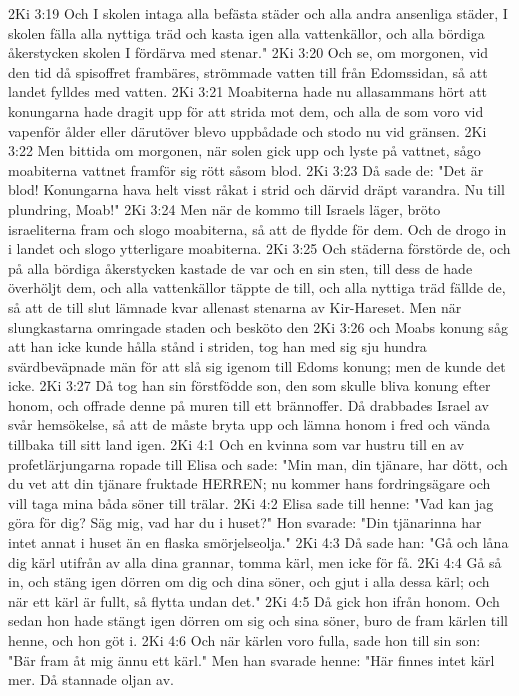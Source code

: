 2Ki 3:19  Och I skolen intaga alla befästa städer och alla andra ansenliga städer, I skolen fälla alla nyttiga träd och kasta igen alla vattenkällor, och alla bördiga åkerstycken skolen I fördärva med stenar."
2Ki 3:20  Och se, om morgonen, vid den tid då spisoffret frambäres, strömmade vatten till från Edomssidan, så att landet fylldes med vatten.
2Ki 3:21  Moabiterna hade nu allasammans hört att konungarna hade dragit upp för att strida mot dem, och alla de som voro vid vapenför ålder eller därutöver blevo uppbådade och stodo nu vid gränsen.
2Ki 3:22  Men bittida om morgonen, när solen gick upp och lyste på vattnet, sågo moabiterna vattnet framför sig rött såsom blod.
2Ki 3:23  Då sade de: "Det är blod! Konungarna hava helt visst råkat i strid och därvid dräpt varandra. Nu till plundring, Moab!"
2Ki 3:24  Men när de kommo till Israels läger, bröto israeliterna fram och slogo moabiterna, så att de flydde för dem. Och de drogo in i landet och slogo ytterligare moabiterna.
2Ki 3:25  Och städerna förstörde de, och på alla bördiga åkerstycken kastade de var och en sin sten, till dess de hade överhöljt dem, och alla vattenkällor täppte de till, och alla nyttiga träd fällde de, så att de till slut lämnade kvar allenast stenarna av Kir-Hareset. Men när slungkastarna omringade staden och besköto den
2Ki 3:26  och Moabs konung såg att han icke kunde hålla stånd i striden, tog han med sig sju hundra svärdbeväpnade män för att slå sig igenom till Edoms konung; men de kunde det icke.
2Ki 3:27  Då tog han sin förstfödde son, den som skulle bliva konung efter honom, och offrade denne på muren till ett brännoffer. Då drabbades Israel av svår hemsökelse, så att de måste bryta upp och lämna honom i fred och vända tillbaka till sitt land igen.
2Ki 4:1  Och en kvinna som var hustru till en av profetlärjungarna ropade till Elisa och sade: "Min man, din tjänare, har dött, och du vet att din tjänare fruktade HERREN; nu kommer hans fordringsägare och vill taga mina båda söner till trälar.
2Ki 4:2  Elisa sade till henne: "Vad kan jag göra för dig? Säg mig, vad har du i huset?" Hon svarade: "Din tjänarinna har intet annat i huset än en flaska smörjelseolja."
2Ki 4:3  Då sade han: "Gå och låna dig kärl utifrån av alla dina grannar, tomma kärl, men icke för få.
2Ki 4:4  Gå så in, och stäng igen dörren om dig och dina söner, och gjut i alla dessa kärl; och när ett kärl är fullt, så flytta undan det."
2Ki 4:5  Då gick hon ifrån honom. Och sedan hon hade stängt igen dörren om sig och sina söner, buro de fram kärlen till henne, och hon göt i.
2Ki 4:6  Och när kärlen voro fulla, sade hon till sin son: "Bär fram åt mig ännu ett kärl." Men han svarade henne: "Här finnes intet kärl mer. Då stannade oljan av.
